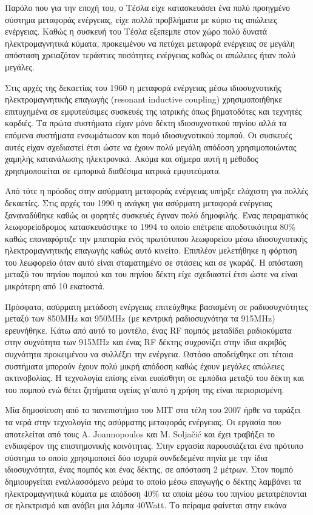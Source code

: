 Παρόλο που για την εποχή του, ο Τέσλα είχε κατασκευάσει ένα πολύ προηγμένο σύστημα μεταφοράς ενέργειας, είχε πολλά προβλήματα με κύριο τις απώλειες ενέργειας. Καθώς
η συσκευή του Τέσλα εξεπεμπε στον χώρο πολύ δυνατά ηλεκτρομαγνητικά κύματα, προκειμένου να πετύχει μεταφορά ενέργειας σε μεγάλη απόσταση χρειαζόταν τεράστιες
ποσότητες ενέργειας καθώς οι απώλειες ήταν πολύ μεγάλες.

Στις αρχές της δεκαετίας του 1960 η μεταφορά ενέργειας μέσω ιδιοσυχνοτικής ηλεκτρομαγνητικής επαγωγής (resonant inductive coupling) χρησιμοποιήθηκε επιτυχημένα σε
εμφυτεύσιμες συσκευές της ιατρικής όπως βηματοδότες και τεχνητές καρδιές. Τα πρώτα συστήματα είχαν μόνο δέκτη ιδιοσυχνοτικού πηνίου αλλά τα επόμενα συστήματα
ενσωμάτωσαν και πομό ιδιοσυχνοτικού πομπού. Οι συσκευές αυτές είχαν σχεδιαστεί έτσι ώστε να έχουν πολύ μεγάλη απόδοση χρησιμοποιώντας χαμηλής κατανάλωσης
ηλεκτρονικά. Ακόμα και σήμερα αυτή η μέθοδος χρησιμοποιείται σε εμπορικά διαθέσιμα ιατρικά εμφυτεύματα.

Από τότε η πρόοδος στην ασύρματη μεταφοράς ενέργειας υπήρξε ελάχιστη για πολλές δεκαετίες. Στις αρχές του 1990 η ανάγκη για ασύρματη μεταφορά ενέργειας
ξαναναδύθηκε καθώς οι φορητές συσκευές έγιναν πολύ δημοφιλής. Ένας πειραματικός λεωφορείοδρομος κατασκευάστηκε το 1994 \cite{bus_coil} το οποίο επέτρεπε
αποδοτικότητα 80\% καθώς επαναφόρτιζε την μπαταρία ενός πρωτότυπου λεωφορείου μέσω ιδιοσυχνοτικής ηλεκτρομαγνητικής επαγωγής καθώς αυτό κινείτο. Επιπλέον μελετήθηκε η
φόρτιση του λεωφορείο όταν αυτό είναι σταματημένο σε στάσεις και σε γκαράζ. Η απόσταση μεταξύ του πηνίου πομπού και του πηνίου δέκτη είχε σχεδιαστεί έτσι ώστε να
είναι μικρότερη από 10 εκατοστά.

Πρόσφατα, ασύρματη μετάδοση ενέργειας επιτεύχθηκε βασισμένη σε ραδιοσυχνότητες μεταξύ των 850MHz και 950MHz (με κεντρική ραδιοσυχνότηα τα 915MHz) ερευνήθηκε. Κάτω
από αυτό το μοντέλο, ένας RF πομπός μεταδίδει ραδιοκύματα στην συχνότητα των 915MHz  και ένας RF δέκτης συχρονίζει στην ίδια ακριβός συχνότητα προκειμένου να
συλλέξει την ενέργεια. Ωστόσο αποδείχθηκε οτι τέτοια συστήματα μπορούν έχουν πολύ μικρή απόδοση καθώς έχουν μεγάλες απώλειες ακτινοβολίας. Η τεχνολογία επίσης είναι
ευαίσθητη σε εμπόδια μεταξύ του δέκτη και του πομπού ενώ θέτει ζητήματα υγείας γι'αυτό η χρήση της είναι περιορισμένη.

Μία δημοσίευση από το πανεπιστήμιο του MIT στα τέλη του 2007 ήρθε να ταράξει τα νερά στην τεχνολογία της ασύρματης μεταφοράς ενέργειας. Οι εργασία που αποτελείται
από τους A. Joannopoulos και M. Solja\v{c}i\'{c} και έχει τραβήξει το ενδιαφέρον της επιστημονικής κοινότητας. Στην εργασία παρουσιάζεται ένα πρότυπο σύστημα το
οποίο χρησιμοποιεί δύο ισχυρά συνδεδεμένα πηνία με την ίδια ιδιοσυχνότητα, ένας πομπός και ένας δέκτης, σε απόσταση 2 μέτρων. Στον πομπό δημιουργείται εναλλασσόμενο
ρεύμα το οποίο μέσω επαγωγής ο δέκτης λαμβάνει τα ηλεκτρομαγνητικά κύματα με απόδοση 40\% τα οποία μέσω του πηνίου μετατρέπονται σε ηλεκτρισμό και ανάβει μια λάμπα
40Watt. Το πείραμα φαίνεται στην εικόνα

